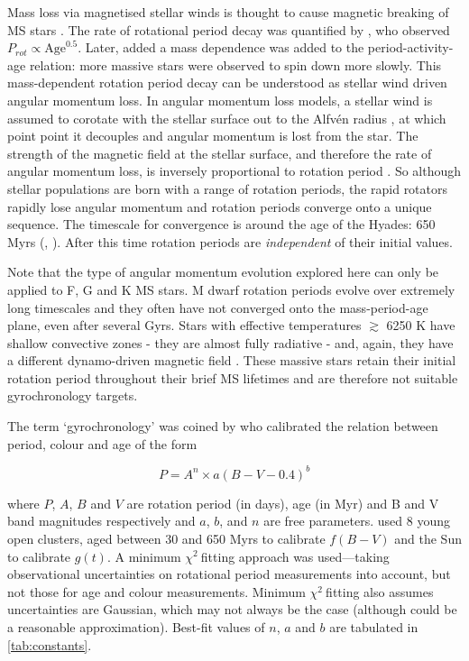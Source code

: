 \documentclass[10pt,preprint]{aastex}
\newcommand{\chit}{$\chi^2~$}
\begin{document}
Mass loss via magnetised stellar winds is thought to cause magnetic breaking of MS stars \citep{Weber1967}.
The rate of rotational period decay was quantified by \citet{Skumanich1972}, who observed $P_{rot} \propto \mathrm{Age}^0.5$.
Later, \citet{Noyes1984_2} added a mass dependence was added to the period-activity-age relation: more massive stars were observed to spin down more slowly.
This mass-dependent rotation period decay can be understood as stellar wind driven angular momentum loss.
In angular momentum loss models, a stellar wind is assumed to corotate with the stellar surface out to the Alfv\'{e}n radius \citep{Weber1967}, at which point point it decouples and angular momentum is lost from the star.
The strength of the magnetic field at the stellar surface, and therefore the rate of angular momentum loss, is inversely proportional to rotation period \citep{Kawaler1988}.
So although stellar populations are born with a range of rotation periods, the rapid rotators rapidly lose angular momentum and rotation periods converge onto a unique sequence.
The timescale for convergence is around the age of the Hyades: 650 Myrs (\citealt{Radick1987}, \citealt{Irwin2009}).
After this time rotation periods are \emph{independent} of their initial values.

Note that the type of angular momentum evolution explored here can only be applied to F, G and K MS stars.
M dwarf rotation periods evolve over extremely long timescales and they often have not converged onto the mass-period-age plane, even after several Gyrs.
Stars with effective temperatures $\gtrsim$ 6250 K have shallow convective zones - they are almost fully radiative - and, again, they have a different dynamo-driven magnetic field \citep{Kraft1967}.
These massive stars retain their initial rotation period throughout their brief MS lifetimes and are therefore not suitable gyrochronology targets.

The term `gyrochronology' was coined by \citet{Barnes2003} who calibrated the relation between period, colour and age of the form

\begin{equation}
P = A^n \times a(B-V-0.4)^b
\label{eq:Barnes2007_2}
\end{equation}

where $P$, $A$, $B$ and $V$ are rotation period (in days), age (in Myr) and B and V band magnitudes respectively and $a$, $b$, and $n$ are free parameters.
\citet{Barnes2007} used 8 young open clusters, aged between 30 and 650 Myrs to calibrate $f(B-V)$ and the Sun to calibrate $g(t)$.
A minimum \chit fitting approach was used---taking observational uncertainties on rotational period measurements into account, but not those for age and colour measurements.
Minimum \chit fitting also assumes uncertainties are Gaussian, which may not always be the case (although could be a reasonable approximation).
Best-fit values of $n$, $a$ and $b$ are tabulated in \ref{tab:constants}.
\end{document}
